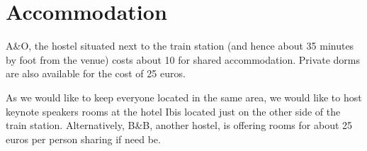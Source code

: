 

\section{Accommodation}

A&O, the hostel situated next to the train station (and hence about 35 minutes by foot from the venue) costs about 10 for shared accommodation. Private dorms are also available for the cost of 25 euros. 

As we would like to keep everyone located in the same area, we would like to host keynote speakers rooms at the hotel Ibis located just on the other side of the train station. 
Alternatively, B&B, another hostel, is offering rooms for about 25 euros per person sharing if need be. 


